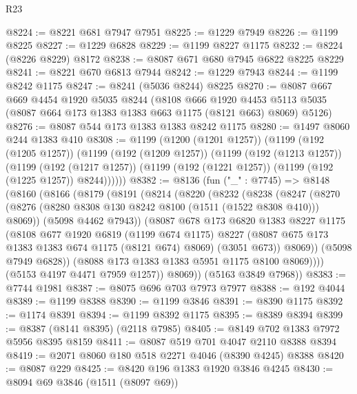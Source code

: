 \begin{lexlean}{R23}
\begin{coremodule}
@8224 := @8221 @681 @7947 @7951
@8225 := @1229 @7949
@8226 := @1199 @8225
@8227 := @1229 @6828
@8229 := @1199 @8227 @1175
@8232 := @8224 (@8226 @8229) @8172
@8238 := @8087 @671 @680 @7945 @6822 @8225 @8229
@8241 := @8221 @670 @6813 @7944
@8242 := @1229 @7943
@8244 := @1199 @8242 @1175
@8247 := @8241 (@5036 @8244) @8225
@8270 := @8087
    @667
    @669
    @4454
    @1920
    @5035
    @8244
    (@8108
      @666
      @1920
      @4453
      @5113
      @5035
      (@8087 @664 @173 @1383 @1383 @663 @1175 (@8121 @663) @8069)
      @5126)
@8276 := @8087 @544 @173 @1383 @1383 @8242 @1175
@8280 := @1497 @8060 @244 @1383 @410
@8308 := @1199
    (@1200 (@1201 @1257))
    (@1199
      (@192 (@1205 @1257))
      (@1199
        (@192 (@1209 @1257))
        (@1199
          (@192 (@1213 @1257))
          (@1199
            (@192 (@1217 @1257))
            (@1199 (@192 (@1221 @1257)) (@1199 (@192 (@1225 @1257)) @8244))))))
@8382 := @8136
    (fun ("_" : @7745) =>
    @8148
      (@8160
        (@8166
          (@8179
            (@8191
              (@8214
                (@8220
                  (@8232
                    (@8238
                      (@8247
                        (@8270
                          (@8276 (@8280 @8308 @130 @8242 @8100 (@1511 (@1522 @8308 @410))) @8069))
                        (@5098 @4462 @7943))
                      (@8087
                        @678
                        @173
                        @6820
                        @1383
                        @8227
                        @1175
                        (@8108
                          @677
                          @1920
                          @6819
                          (@1199 @674 @1175)
                          @8227
                          (@8087 @675 @173 @1383 @1383 @674 @1175 (@8121 @674) @8069)
                          (@3051 @673))
                        @8069))
                    (@5098 @7949 @6828))
                  (@8088 @173 @1383 @1383 @5951 @1175 @8100 @8069))))
            (@5153 @4197 @4471 @7959 @1257))
          @8069))
      (@5163 @3849 @7968))
@8383 := @7744 @1981
@8387 := @8075 @696 @703 @7973 @7977
@8388 := @192 @4044
@8389 := @1199 @8388
@8390 := @1199 @3846
@8391 := @8390 @1175
@8392 := @1174 @8391
@8394 := @1199 @8392 @1175
@8395 := @8389 @8394
@8399 := @8387 (@8141 @8395) (@2118 @7985)
@8405 := @8149 @702 @1383 @7972 @5956 @8395 @8159
@8411 := @8087 @519 @701 @4047 @2110 @8388 @8394
@8419 := @2071 @8060 @180 @518 @2271 @4046 (@8390 @4245) @8388
@8420 := @8087 @229
@8425 := @8420 @196 @1383 @1920 @3846 @4245
@8430 := @8094 @69 @3846 (@1511 (@8097 @69))

\end{coremodule}
\end{lexlean}

